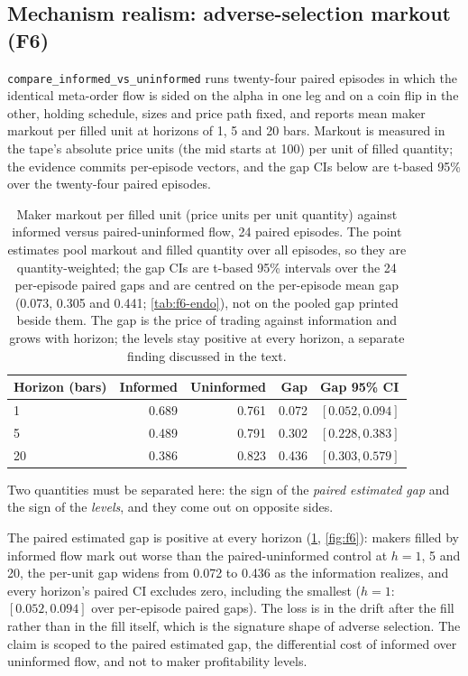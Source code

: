 \subsection{Mechanism realism: adverse-selection markout (F6)}\label{sec:f6}

\texttt{compare\_informed\_vs\_uninformed} runs twenty-four paired episodes in which the identical meta-order flow is sided on the alpha in one leg and on a coin flip in the other, holding schedule, sizes and price path fixed, and reports mean maker markout per filled unit at horizons of 1, 5 and 20 bars. Markout is measured in the tape's absolute price units (the mid starts at 100) per unit of filled quantity; the evidence commits per-episode vectors, and the gap CIs below are t-based 95\% over the twenty-four paired episodes.

\begin{table}[t]
\centering
\caption{Maker markout per filled unit (price units per unit quantity) against informed versus paired-uninformed flow, 24 paired episodes. The point estimates pool markout and filled quantity over all episodes, so they are quantity-weighted; the gap CIs are t-based 95\% intervals over the 24 per-episode paired gaps and are centred on the per-episode mean gap (0.073, 0.305 and 0.441; \cref{tab:f6-endo}), not on the pooled gap printed beside them. The gap is the price of trading against information and grows with horizon; the levels stay positive at every horizon, a separate finding discussed in the text.}
\label{tab:f6}
\small
\begin{tabular}{lrrrl}
\toprule
Horizon (bars) & Informed & Uninformed & Gap & Gap 95\% CI \\
\midrule
1 & 0.689 & 0.761 & 0.072 & $[0.052, 0.094]$ \\
5 & 0.489 & 0.791 & 0.302 & $[0.228, 0.383]$ \\
20 & 0.386 & 0.823 & 0.436 & $[0.303, 0.579]$ \\
\bottomrule
\end{tabular}
\end{table}

Two quantities must be separated here: the sign of the \emph{paired estimated gap} and the sign of the \emph{levels}, and they come out on opposite sides.

The paired estimated gap is positive at every horizon (\cref{tab:f6}, \cref{fig:f6}): makers filled by informed flow mark out worse than the paired-uninformed control at $h = 1$, 5 and 20, the per-unit gap widens from 0.072 to 0.436 as the information realizes, and every horizon's paired CI excludes zero, including the smallest ($h = 1$: $[0.052, 0.094]$ over per-episode paired gaps). The loss is in the drift after the fill rather than in the fill itself, which is the signature shape of adverse selection. The claim is scoped to the paired estimated gap, the differential cost of informed over uninformed flow, and not to maker profitability levels.

